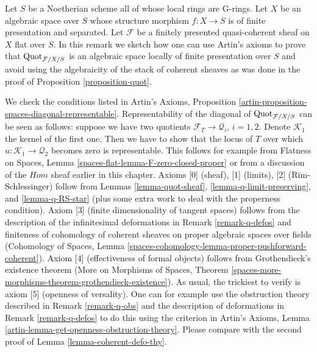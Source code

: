 \begin{remark}
\label{remark-quot-via-artins-axioms}
Let $S$ be a Noetherian scheme all of whose local rings are G-rings.
Let $X$ be an algebraic space over $S$ whose structure morphism
$f : X \to S$ is of finite presentation and separated.
Let $\mathcal{F}$ be a finitely presented quasi-coherent sheaf
on $X$ flat over $S$. In this remark we sketch how one can
use Artin's axioms to prove that $\mathrm{Quot}_{\mathcal{F}/X/S}$
is an algebraic space locally of finite presentation over $S$
and avoid using the algebraicity of the stack of coherent sheaves
as was done in the proof of Proposition \ref{proposition-quot}.

\medskip\noindent
We check the conditions listed in Artin's Axioms, Proposition
\ref{artin-proposition-spaces-diagonal-representable}.
Representability of the diagonal of $\mathrm{Quot}_{\mathcal{F}/X/S}$
can be seen as follows: suppose we have two quotients
$\mathcal{F}_T \to \mathcal{Q}_i$, $i = 1, 2$. Denote
$\mathcal{K}_1$ the kernel of the first one. Then we have
to show that the locus of $T$ over which
$u : \mathcal{K}_1 \to \mathcal{Q}_2$ becomes zero is representable.
This follows for example from Flatness on Spaces, Lemma
\ref{spaces-flat-lemma-F-zero-closed-proper}
or from a discussion of the $\mathit{Hom}$ sheaf earlier
in this chapter. Axioms [0] (sheaf), [1] (limits), [2] (Rim-Schlessinger)
follow from Lemmas \ref{lemma-quot-sheaf},
\ref{lemma-q-limit-preserving}, and \ref{lemma-q-RS-star}
(plus some extra work to deal with the properness condition).
Axiom [3] (finite dimensionality of tangent spaces)
follows from the description of the infinitesimal
deformations in Remark \ref{remark-q-defos}
and finiteness of cohomology of coherent sheaves on proper
algebraic spaces over fields (Cohomology of Spaces, Lemma
\ref{spaces-cohomology-lemma-proper-pushforward-coherent}).
Axiom [4] (effectiveness of formal objects)
follows from Grothendieck's existence theorem
(More on Morphisms of Spaces, Theorem
\ref{spaces-more-morphisms-theorem-grothendieck-existence}).
As usual, the trickiest to verify is axiom [5] (openness of versality).
One can for example use the obstruction theory described
in Remark \ref{remark-q-obs} and the description of
deformations in Remark \ref{remark-q-defos}
to do this using the criterion in
Artin's Axioms, Lemma \ref{artin-lemma-get-openness-obstruction-theory}.
Please compare with the second proof of
Lemma \ref{lemma-coherent-defo-thy}.
\end{remark}









